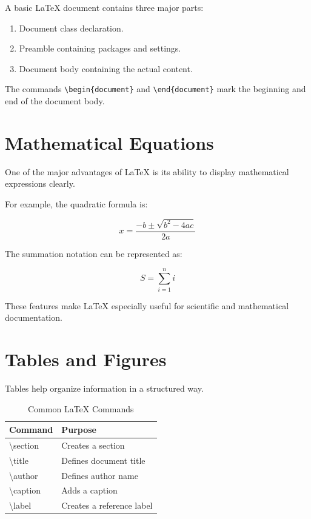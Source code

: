 \documentclass[12pt,a4paper]{article}
\begin{document}
A basic LaTeX document contains three major parts:

\begin{enumerate}
    \item Document class declaration.
    \item Preamble containing packages and settings.
    \item Document body containing the actual content.
\end{enumerate}

The commands \texttt{\textbackslash begin\{document\}}
and \texttt{\textbackslash end\{document\}} mark the
beginning and end of the document body.

\section{Mathematical Equations}

One of the major advantages of LaTeX is its ability
to display mathematical expressions clearly.

For example, the quadratic formula is:

\begin{equation}
x = \frac{-b \pm \sqrt{b^2 - 4ac}}{2a}
\end{equation}

The summation notation can be represented as:

\begin{equation}
S = \sum_{i=1}^{n} i
\end{equation}

These features make LaTeX especially useful for
scientific and mathematical documentation.

\section{Tables and Figures}

Tables help organize information in a structured way.

\begin{table}[h]
\centering
\caption{Common LaTeX Commands}
\begin{tabular}{ll}
\toprule
\textbf{Command} & \textbf{Purpose} \\
\midrule
\textbackslash section & Creates a section \\
\textbackslash title & Defines document title \\
\textbackslash author & Defines author name \\
\textbackslash caption & Adds a caption \\
\textbackslash label & Creates a reference label \\
\bottomrule
\end{tabular}
\end{table}
\end{document}
